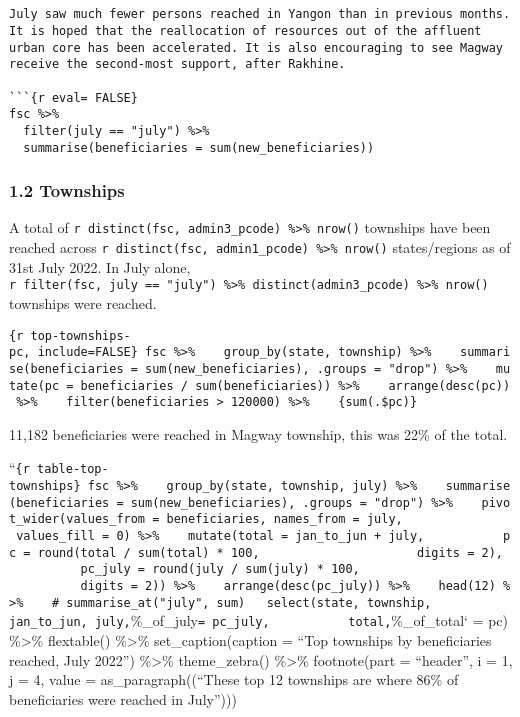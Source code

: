\documentclass[
]{article}
\begin{document}
\begin{verbatim}


July saw much fewer persons reached in Yangon than in previous months. It is hoped that the reallocation of resources out of the affluent urban core has been accelerated. It is also encouraging to see Magway receive the second-most support, after Rakhine. 

```{r eval= FALSE}
fsc %>% 
  filter(july == "july") %>% 
  summarise(beneficiaries = sum(new_beneficiaries))
\end{verbatim}

\hypertarget{townships}{%
\subsubsection{1.2 Townships}\label{townships}}

A total of
\texttt{r\ distinct(fsc,\ admin3\_pcode)\ \%\textgreater{}\%\ nrow()}
townships have been reached across
\texttt{r\ distinct(fsc,\ admin1\_pcode)\ \%\textgreater{}\%\ nrow()}
states/regions as of 31st July 2022. In July alone,
\texttt{r\ filter(fsc,\ july\ ==\ "july")\ \%\textgreater{}\%\ distinct(admin3\_pcode)\ \%\textgreater{}\%\ nrow()}
townships were reached.

\texttt{\{r\ top-townships-pc,\ include=FALSE\}\ fsc\ \%\textgreater{}\%\ \ \ \ group\_by(state,\ township)\ \%\textgreater{}\%\ \ \ \ summarise(beneficiaries\ =\ sum(new\_beneficiaries),\ .groups\ =\ "drop")\ \%\textgreater{}\%\ \ \ \ mutate(pc\ =\ beneficiaries\ /\ sum(beneficiaries))\ \%\textgreater{}\%\ \ \ \ arrange(desc(pc))\ \%\textgreater{}\%\ \ \ \ filter(beneficiaries\ \textgreater{}\ 120000)\ \%\textgreater{}\%\ \ \ \ \{sum(.\$pc)\}}

11,182 beneficiaries were reached in Magway township, this was 22\% of
the total.

``\texttt{\{r\ table-top-townships\}\ fsc\ \%\textgreater{}\%\ \ \ \ group\_by(state,\ township,\ july)\ \%\textgreater{}\%\ \ \ \ summarise(beneficiaries\ =\ sum(new\_beneficiaries),\ .groups\ =\ "drop")\ \%\textgreater{}\%\ \ \ \ pivot\_wider(values\_from\ =\ beneficiaries,\ names\_from\ =\ july,\ \ \ \ \ \ \ \ \ \ \ \ \ \ \ \ values\_fill\ =\ 0)\ \%\textgreater{}\%\ \ \ \ mutate(total\ =\ jan\_to\_jun\ +\ july,\ \ \ \ \ \ \ \ \ \ \ pc\ =\ round(total\ /\ sum(total)\ *\ 100,\ \ \ \ \ \ \ \ \ \ \ \ \ \ \ \ \ \ \ \ \ \ digits\ =\ 2),\ \ \ \ \ \ \ \ \ \ \ pc\_july\ =\ round(july\ /\ sum(july)\ *\ 100,\ \ \ \ \ \ \ \ \ \ \ \ \ \ \ \ \ \ \ \ \ \ \ \ \ \ \ \ \ \ \ digits\ =\ 2))\ \%\textgreater{}\%\ \ \ \ arrange(desc(pc\_july))\ \%\textgreater{}\%\ \ \ \ head(12)\ \%\textgreater{}\%\ \ \ \ \#\ summarise\_at("july",\ sum)\ \ \ select(state,\ township,\ \ \ \ \ \ \ \ \ \ \ jan\_to\_jun,\ july,}\%\_of\_july\texttt{=\ pc\_july,\ \ \ \ \ \ \ \ \ \ \ total,}\%\_of\_total`
= pc) \%\textgreater\% flextable() \%\textgreater\% set\_caption(caption
= ``Top townships by beneficiaries reached, July 2022'')
\%\textgreater\% theme\_zebra() \%\textgreater\% footnote(part =
``header'', i = 1, j = 4, value = as\_paragraph((``These top 12
townships are where 86\% of beneficiaries were reached in July'')))
\end{document}
